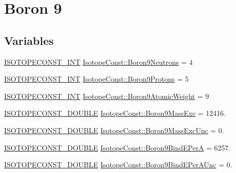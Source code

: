 \hypertarget{group___isotope_const-_boron-_b9}{}\section{Boron 9}
\label{group___isotope_const-_boron-_b9}
\subsection*{Variables}
\begin{DoxyCompactItemize}
\item 
\mbox{\hyperlink{group___isotope_const-_macros_ga5f18360b3e99483a35c32d789e62621c}{I\+S\+O\+T\+O\+P\+E\+C\+O\+N\+S\+T\+\_\+\+I\+NT}} \mbox{\hyperlink{group___isotope_const-_boron-_b9_ga5e4883432f67641b49aebffd94c1c7d0}{Isotope\+Const\+::\+Boron9\+Neutrons}} = 4
\item 
\mbox{\hyperlink{group___isotope_const-_macros_ga5f18360b3e99483a35c32d789e62621c}{I\+S\+O\+T\+O\+P\+E\+C\+O\+N\+S\+T\+\_\+\+I\+NT}} \mbox{\hyperlink{group___isotope_const-_boron-_b9_ga49aef02bee55980a9d0152ececc71dd0}{Isotope\+Const\+::\+Boron9\+Protons}} = 5
\item 
\mbox{\hyperlink{group___isotope_const-_macros_ga5f18360b3e99483a35c32d789e62621c}{I\+S\+O\+T\+O\+P\+E\+C\+O\+N\+S\+T\+\_\+\+I\+NT}} \mbox{\hyperlink{group___isotope_const-_boron-_b9_ga48576e89b587b9a3868266ecab8d295c}{Isotope\+Const\+::\+Boron9\+Atomic\+Weight}} = 9
\item 
\mbox{\hyperlink{group___isotope_const-_macros_ga8f45a7272ce02c0b4c65c44636ed719a}{I\+S\+O\+T\+O\+P\+E\+C\+O\+N\+S\+T\+\_\+\+D\+O\+U\+B\+LE}} \mbox{\hyperlink{group___isotope_const-_boron-_b9_ga1924a7435fc475298441d0fb01d6393d}{Isotope\+Const\+::\+Boron9\+Mass\+Exc}} = 12416.
\item 
\mbox{\hyperlink{group___isotope_const-_macros_ga8f45a7272ce02c0b4c65c44636ed719a}{I\+S\+O\+T\+O\+P\+E\+C\+O\+N\+S\+T\+\_\+\+D\+O\+U\+B\+LE}} \mbox{\hyperlink{group___isotope_const-_boron-_b9_ga43df35e232ee8040b3a59c82bbb936cf}{Isotope\+Const\+::\+Boron9\+Mass\+Exc\+Unc}} = 0.
\item 
\mbox{\hyperlink{group___isotope_const-_macros_ga8f45a7272ce02c0b4c65c44636ed719a}{I\+S\+O\+T\+O\+P\+E\+C\+O\+N\+S\+T\+\_\+\+D\+O\+U\+B\+LE}} \mbox{\hyperlink{group___isotope_const-_boron-_b9_ga6c63fe5ddc52741edb85a668c78d95b1}{Isotope\+Const\+::\+Boron9\+Bind\+E\+PerA}} = 6257.
\item 
\mbox{\hyperlink{group___isotope_const-_macros_ga8f45a7272ce02c0b4c65c44636ed719a}{I\+S\+O\+T\+O\+P\+E\+C\+O\+N\+S\+T\+\_\+\+D\+O\+U\+B\+LE}} \mbox{\hyperlink{group___isotope_const-_boron-_b9_ga420b5aa3b0eb552a9c11735f964e9f73}{Isotope\+Const\+::\+Boron9\+Bind\+E\+Per\+A\+Unc}} = 0.

\end{DoxyCompactItemize}
